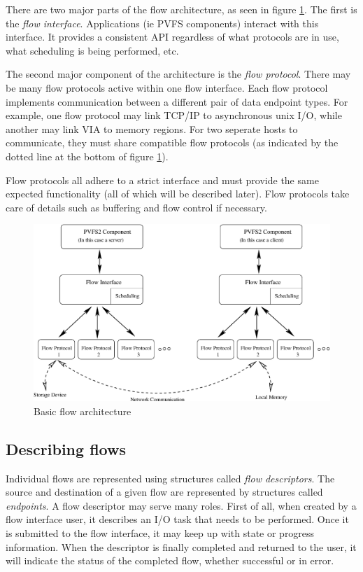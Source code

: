 \documentclass[12pt]{article} %
\begin{document}
There are two major parts of the flow architecture, as seen in figure
\ref{fig:flow-arch}.  The first is the
\emph{flow interface}.  Applications (ie PVFS components) interact with
this interface.  It provides a consistent API regardless of what
protocols are in use, what scheduling is being performed, etc.  

The second major component of the architecture is the \emph{flow
protocol}.
There may be many flow protocols active within one flow interface.  Each
flow protocol implements communication between a different pair of data
endpoint types.  For example, one flow protocol may link TCP/IP to
asynchronous unix I/O, while another may link VIA to memory regions.  For
two seperate hosts to communicate, they must share compatible flow
protocols (as indicated by the dotted line at the bottom of figure
\ref{fig:flow-arch}).

Flow protocols all adhere to a strict interface 
and must provide the same expected functionality (all of which will be
described later).  Flow protocols take care of details such as buffering
and flow control if necessary.


\begin{figure}
\begin{center}
\caption{Basic flow architecture \label{fig:flow-arch}}
\includegraphics[scale=0.6]{flow-arch.eps}
\end{center}
\end{figure}

\subsection{Describing flows}

Individual flows are represented using structures called \emph{flow
descriptors}.  The source and destination of a given flow are represented
by structures called \emph{endpoints}.  A flow descriptor may serve
many roles.  First of all, when created by a flow interface user, it
describes an I/O task that needs to be performed.  Once it is submitted
to the flow interface, it may keep up with state or progress information.
When the descriptor is finally completed and returned to the user, it will
indicate the status of the completed flow, whether successful or in error.
\end{document}

